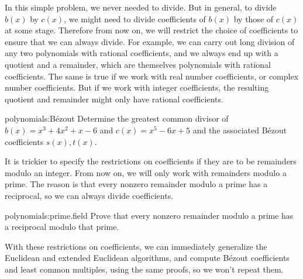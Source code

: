 In this simple problem, we never needed to divide.
But in general, to divide \(b(x)\) by \(c(x)\), we might need to divide coefficients of \(b(x)\) by those of \(c(x)\) at some stage.
Therefore from now on, we will restrict the choice of coefficients to ensure that we can always divide.
For example, we can carry out long division of any two polynomials with rational coefficients, and we always end up with a quotient and a remainder, which are themselves polynomials with rational coefficients.
The same is true if we work with real number coefficients, or complex number coefficients.
But if we work with integer coefficients, the resulting quotient and remainder might only have rational coefficients.

\begin{problem}{polynomials:B\'ezout}
Determine the greatest common divisor of \(b(x) = x^3 +4x^2+x-6\) and \(c(x) = x^5-6x+5\) and the associated B\'ezout coefficients \(s(x), t(x)\).
\end{problem}

It is trickier to specify the restrictions on coefficients if they are to be remainders modulo an integer.
From now on, we will only work with remainders modulo a prime.
The reason is that every nonzero remainder modulo a prime has a reciprocal, so we can always divide coefficients.

\begin{problem}{polynomials:prime.field}
Prove that every nonzero remainder modulo a prime has a reciprocal modulo that prime.
\end{problem}

With these restrictions on coefficients, we can immediately generalize the Euclidean and extended Euclidean algorithms, and compute B\'ezout coefficients and least common multiples, using the same proofs, so we won't repeat them.

